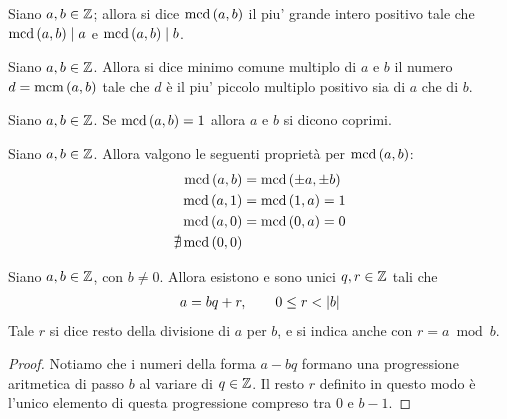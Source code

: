 \begin{definition}
    Siano $a, b \in \mathbb{Z}$; allora si dice $\operatorname{mcd}\left(a, b\right)$ il piu' grande intero positivo
    tale che $\operatorname{mcd}\left(a, b\right) \mid a$ e $\operatorname{mcd}\left(a, b\right) \mid b$.
\end{definition}

\begin{definition}
    Siano $a, b \in \mathbb{Z}$. Allora si dice minimo comune multiplo di $a$ e $b$ il numero $d = \operatorname{mcm}\left(a, b\right)$ tale che $d$ è il piu' piccolo multiplo positivo sia di $a$ che di $b$.
\end{definition}

\begin{definition}[Coprimo]
    Siano $a, b \in \mathbb{Z}$. Se $\operatorname{mcd}\left(a, b\right) = 1$ allora $a$ e $b$ si dicono coprimi.
\end{definition}

\begin{remark}
    Siano $a, b \in \mathbb{Z}$. Allora valgono le seguenti proprietà per $\operatorname{mcd}\left(a, b\right)$:
    \begin{align*}
        \operatorname{mcd}\left(a, b\right) &= \operatorname{mcd}\left(\pm a, \pm b\right) \\
        \operatorname{mcd}\left(a, 1\right) &= \operatorname{mcd}\left(1, a\right) = 1 \\
        \operatorname{mcd}\left(a, 0\right) &= \operatorname{mcd}\left(0, a\right) = 0 \\
        \nexists \operatorname{mcd}\left(0, 0\right)
    \end{align*}
\end{remark}

\begin{theorem} \label{esistenza_resto}
    Siano $a, b \in \mathbb{Z}$, con $b \neq 0$. Allora esistono e sono unici $q, r \in \mathbb{Z}$ tali che
    \begin{align}
        a = bq + r, \qquad0 \leq r < \left|b\right|
    \end{align}
    Tale $r$ si dice resto della divisione di $a$ per $b$, e si indica anche con $r = a\bmod b$.
\end{theorem}

\begin{proof}
    Notiamo che i numeri della forma $a - bq$ formano una progressione aritmetica di passo $b$ al variare di $q \in \mathbb{Z}$. 
    Il resto $r$ definito in questo modo è l'unico elemento di questa progressione compreso tra $0$ e $b - 1$.
\end{proof}

